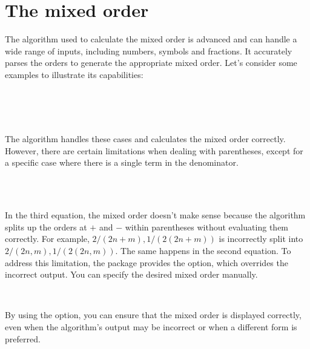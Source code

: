 	
	\clearpage
	\section{The mixed order} \label{ssec:overall_order}
The algorithm used to calculate the mixed order is advanced and can handle a wide range of inputs, including numbers, symbols and fractions. It accurately parses the orders to generate the appropriate mixed order. Let's consider some examples to illustrate its capabilities:
\begin{example}
	\\
	\\
	\\
\end{example}
The algorithm handles these cases and calculates the mixed order correctly. However, there are certain limitations when dealing with parentheses, except for a specific case where there is a single term in the denominator. 
\begin{example}
	\\
	\\
\end{example}
In the third equation, the mixed order doesn't make sense because the algorithm splits up the orders at $+$ and $-$ within parentheses without evaluating them correctly. For example, $2/(2n+m), 1/(2(2n+m))$ is incorrectly split into $2/(2n, m), 1/(2(2n, m))$. The same happens in the second equation. To address this limitation, the package provides the  option, which overrides the incorrect output. You can specify the desired mixed order manually.
\begin{example}
	\\
\end{example}
By using the  option, you can ensure that the mixed order is displayed correctly, even when the algorithm's output may be incorrect or when a different form is preferred.


